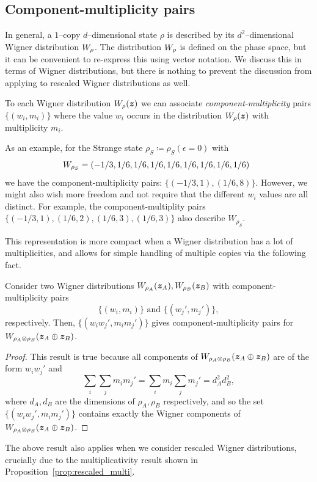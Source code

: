 \documentclass[pra,
aps,
twocolumn,
superscriptaddress,
groupedaddress,
nofootinbib,
reprint
]{revtex4-1}
\begin{document}
\subsection{Component-multiplicity pairs}
\label{app:cmpairs}

In general, a $1$--copy $d$--dimensional state $\rho$ is described by its $d^2$--dimensional Wigner distribution $\W{\rho}$. 
The distribution $\W{\rho}$ is defined on the phase space, but it can be convenient to re-express this using vector notation.
We discuss this in terms of Wigner distributions, but there is nothing to prevent the discussion from applying to rescaled Wigner distributions as well.

To each Wigner distribution $W_\rho(\bm{z})$ we can associate \emph{component-multiplicity} pairs $\{(w_i, m_i)\}$ where the value $w_i$ occurs in the distribution $W_\rho(\bm{z})$ with multiplicity $m_i$.

As an example, for the Strange state $\rho_S \coloneqq \rho_S(\epsilon=0)$ with
\begin{equation}
\hspace{-5pt} W_{\rho_S} = (-1/3, 1/6,  1/6,  1/6,  1/6,  1/6,  1/6,  1/6,  1/6)
\end{equation}
we have the component-multiplicity pairs: $\{( -1/3, 1), ( 1/6, 8)\}$. However, we might also wish more freedom and not require that the different $w_i$ values are all distinct. For example, the component-multiplity pairs $\{(-1/3, 1), (1/6, 2), (1/6, 3), (1/6, 3)\}$ also describe $W_{\rho_S}$.

This representation is more compact when a Wigner distribution has a lot of multiplicities, and allows for simple handling of multiple copies via the following fact.
\begin{proposition}
Consider two Wigner distributions $\W{\rho_A}(\bmz_A), \W{\rho_B}(\bmz_B)$ with component-multiplicity pairs 
\begin{equation}
	\{(w_i, m_i)\} \text{ and } \{(w_j', m_j')\},
\end{equation}
respectively. Then, $\{(w_i w_j', m_i m_j')\}$ gives component-multiplicity pairs for $\W{\rho_A \otimes \rho_B}(\bmz_A \oplus \bmz_B)$.
\end{proposition}
\begin{proof}
	This result is true because all components of $\W{\rho_A \otimes \rho_B}(\bmz_A \oplus \bmz_B)$ are of the form $w_i w_j'$ and 
\begin{equation*}
	\sum_{i}\sum_{j} m_i m_j' = \sum_{i} m_i \sum_{j} m_j' = d_A^2 d_B^2,
\end{equation*}
where $d_A, d_B$ are the dimensions of $\rho_A, \rho_B$ respectively, and
so the set $\{(w_i w_j', m_i m_j')\}$ contains exactly the Wigner components of $\W{\rho_A \otimes \rho_B}(\bmz_A \oplus \bmz_B)$.
\end{proof}
The above result also applies when we consider rescaled Wigner distributions, crucially due to the multiplicativity result shown in Proposition~\ref{prop:rescaled_multi}.
\end{document}

